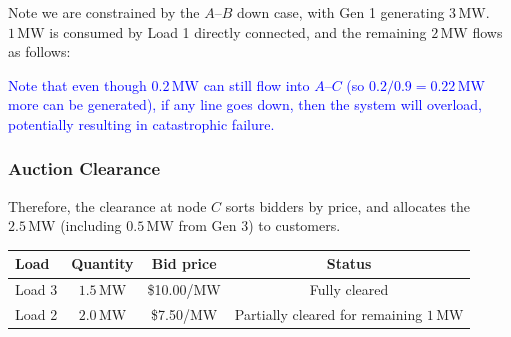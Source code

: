 \documentclass[11pt]{article}
\begin{document}
Note we are constrained by the $A$--$B$ down case, with Gen 1 generating $3\,\mathrm{MW}$. $1\,\mathrm{MW}$ is consumed by Load 1 directly connected, and the remaining $2\,\mathrm{MW}$ flows as follows:

\begin{center}
\end{center}

\textcolor{blue}{Note that even though $0.2\,\mathrm{MW}$ can still flow into $A$--$C$ (so $0.2/0.9 = 0.22\,\mathrm{MW}$ more can be generated), if any line goes down, then the system will overload, potentially resulting in catastrophic failure.}

\subsubsection*{Auction Clearance}

Therefore, the clearance at node $C$ sorts bidders by price, and allocates the $2.5\,\mathrm{MW}$ (including $0.5\,\mathrm{MW}$ from Gen 3) to customers.

\begin{center}
\begin{tabular}{lccc}
\toprule
Load & Quantity & Bid price & Status \\
\midrule
Load 3 & $1.5\,\mathrm{MW}$ & \$10.00/MW & Fully cleared \\
Load 2 & $2.0\,\mathrm{MW}$ & \$7.50/MW & Partially cleared for remaining $1\,\mathrm{MW}$ \\
\bottomrule
\end{tabular}
\end{center}
\end{document}
